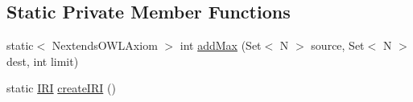 \subsection*{Static Private Member Functions}
\begin{DoxyCompactItemize}
\item 
static$<$ Nextends\-O\-W\-L\-Axiom $>$ int \hyperlink{classorg_1_1semanticweb_1_1owlapi_1_1debugging_1_1_black_box_o_w_l_debugger_a3449f5df409ef6eaa14327dba230541b}{add\-Max} (Set$<$ N $>$ source, Set$<$ N $>$ dest, int limit)
\item 
static \hyperlink{classorg_1_1semanticweb_1_1owlapi_1_1model_1_1_i_r_i}{I\-R\-I} \hyperlink{classorg_1_1semanticweb_1_1owlapi_1_1debugging_1_1_black_box_o_w_l_debugger_a85d8659d225d94b1bdb08cd2fa797984}{create\-I\-R\-I} ()
\end{DoxyCompactItemize}

